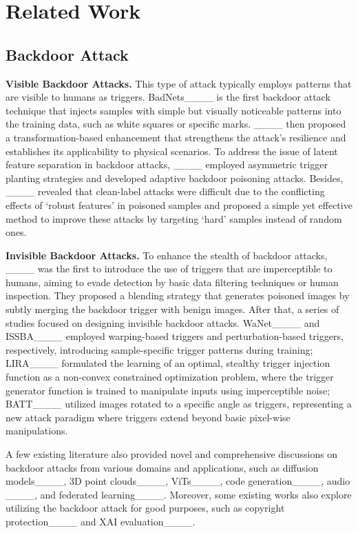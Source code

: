 \section{Related Work}
\label{sec:appen:background}

\subsection{Backdoor Attack}

\noindent\textbf{Visible Backdoor Attacks.}
This type of attack typically employs patterns that are visible to humans as triggers. BadNets____ is the first backdoor attack technique that injects samples with simple but visually noticeable patterns into the training data, such as white squares or specific marks. ____ then proposed a transformation-based enhancement that strengthens the attack's resilience and establishes its applicability to physical scenarios. To address the issue of latent feature separation in backdoor attacks, ____ employed asymmetric trigger planting strategies and developed adaptive backdoor poisoning attacks. Besides, ____ revealed that clean-label attacks were difficult due to the conflicting effects of `robust features' in poisoned samples and proposed a simple yet effective method to improve these attacks by targeting ‘hard’ samples instead of random ones.

\noindent\textbf{Invisible Backdoor Attacks.}
To enhance the stealth of backdoor attacks, ____ was the first to introduce the use of triggers that are imperceptible to humans, aiming to evade detection by basic data filtering techniques or human inspection. They proposed a blending strategy that generates poisoned images by subtly merging the backdoor trigger with benign images. After that, a series of studies focused on designing invisible backdoor attacks. WaNet____ and ISSBA____ employed warping-based triggers and perturbation-based triggers, respectively, introducing sample-specific trigger patterns during training; LIRA____ formulated the learning of an optimal, stealthy trigger injection function as a non-convex constrained optimization problem, where the trigger generator function is trained to manipulate inputs using imperceptible noise; BATT____ utilized images rotated to a specific angle as triggers, representing a new attack paradigm where triggers extend beyond basic pixel-wise manipulations. 

A few existing literature also provided novel and comprehensive discussions on backdoor attacks from various domains and applications, such as diffusion models____, 3D point clouds____, ViTs____, code generation____, audio ____, and federated learning____. Moreover, some existing works also explore utilizing the backdoor attack for good purposes, such as copyright protection____ and XAI evaluation____.

